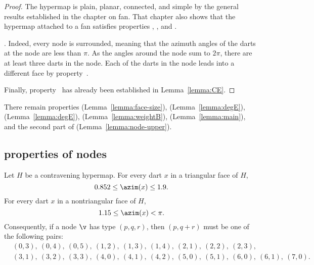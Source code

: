 \begin{proof}
  The hypermap is plain, planar, connected, and simple by the general
  results established in the chapter on fan.  That chapter also shows
  that the hypermap attached to a fan satisfies properties
  , , and .

  .  Indeed, every node is
  surrounded, meaning that the azimuth angles of the darts at the
  node are less than $\pi$.  As the angles around the node sum to
  $2\pi$, there are at least three darts in the node. Each of the
  darts in the node leads into a different face by
  property~.

  Finally, property~ has already been established in
  Lemma~\ref{lemma:CE}.
\end{proof}

There remain properties 
(Lemma~\ref{lemma:face-size}), %
 (Lemma~\ref{lemma:degE}), 
(Lemma~\ref{lemma:degE}), 
(Lemma~\ref{lemma:weightB}), 
(Lemma~\ref{lemma:main}), and the second part of 
(Lemma~\ref{lemma:node-upper}).


\subsection{properties of nodes}
%



\begin{lemma}[] \label{lemma:0.852}
Let $H$ be a contravening
hypermap. For every dart $x$ in a triangular face of $H$,
\[ 0.852\le \azim(x)\le 1.9.\] 
For every dart $x$ in a nontriangular face of $H$, 
\[ 1.15\le\azim(x)<\pi.\] 
%
%
Consequently, if a node $\v$ has type $(p,q,r)$, then $(p,q+r)$ must
be one of the following pairs:
\begin{align*}
  &(0,3),~(0,4),~(0,5),~(1,2),~(1,3),~(1,4),~(2,1),~(2,2),~(2,3),\\
  &(3,1),~(3,2),~(3,3),~(4,0),~(4,1),~(4,2),
  ~(5,0),~(5,1),~(6,0),~(6,1),~(7,0).
\end{align*}
\end{lemma}
%

